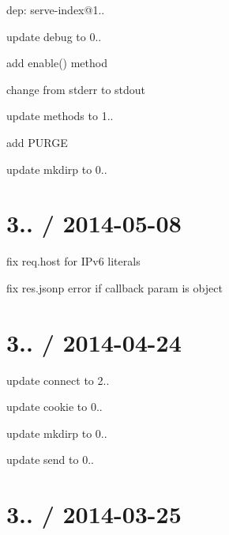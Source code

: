 {\begin{DoxyItemize}
\begin{DoxyItemize}
\item dep\+: serve-\/index@1..
\end{DoxyItemize}
\item update debug to 0..
\begin{DoxyItemize}
\item add {\ttfamily enable()} method
\item change from stderr to stdout
\end{DoxyItemize}
\item update methods to 1..
\begin{DoxyItemize}
\item add P\+U\+R\+GE
\end{DoxyItemize}
\item update mkdirp to 0..
\end{DoxyItemize}}

{\ttfamily \section*{3.. / 2014-\/05-\/08 }}

{\ttfamily }

{\ttfamily 
\begin{DoxyItemize}
\item fix {\ttfamily req.\+host} for I\+Pv6 literals
\item fix {\ttfamily res.\+jsonp} error if callback param is object
\end{DoxyItemize}}

{\ttfamily \section*{3.. / 2014-\/04-\/24 }}

{\ttfamily }

{\ttfamily 
\begin{DoxyItemize}
\item update connect to 2..
\item update cookie to 0..
\item update mkdirp to 0..
\item update send to 0..
\end{DoxyItemize}}

{\ttfamily \section*{3.. / 2014-\/03-\/25 }}

